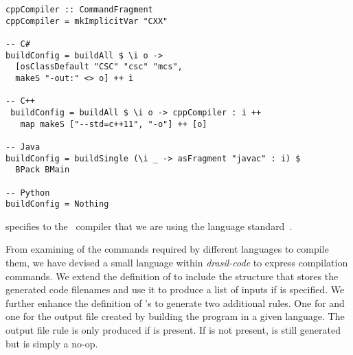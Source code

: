 {{{{{\begin{tcolorbox}[breakable, toprule at break=0pt, bottomrule at break=0pt]
\begin{verbatim}
cppCompiler :: CommandFragment
cppCompiler = mkImplicitVar "CXX"

-- C#
buildConfig = buildAll $ \i o ->
  [osClassDefault "CSC" "csc" "mcs",
  makeS "-out:" <> o] ++ i

-- C++
 buildConfig = buildAll $ \i o -> cppCompiler : i ++
   map makeS ["--std=c++11", "-o"] ++ [o]

-- Java
buildConfig = buildSingle (\i _ -> asFragment "javac" : i) $
  BPack BMain

-- Python
buildConfig = Nothing
\end{verbatim}
\end{tcolorbox}

 specifies to the \CC~compiler that we are using the  language standard~\cite{CXX11}.

From examining of the commands required by different languages to compile them, we have devised a small language within \textit{drasil-code} to express compilation commands. We extend the definition of  to include the structure that stores the generated code filenames and use it to produce a list of inputs if  is specified. We further enhance the definition of 's  to generate two additional rules. One for  and one for the output file created by building the program in a given language. The output file rule is only produced if  is present. If  is not present,  is still generated but is simply a no-op.


% 

}}}}}

